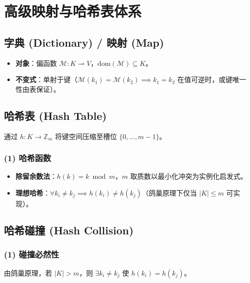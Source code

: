 \section{高级映射与哈希表体系}

\subsection{字典 (Dictionary) / 映射 (Map)}
\begin{itemize}
    \item \textbf{对象}：偏函数 $\mathcal{M}: K \rightharpoonup V$，$\text{dom}(\mathcal{M})\subseteq K$。
    \item \textbf{不变式}：单射于键（$\mathcal{M}(k_1)=\mathcal{M}(k_2)\implies k_1=k_2$ 在值可逆时，或键唯一性由表保证）。
\end{itemize}

\subsection{哈希表 (Hash Table)}
通过 $h: K \to \mathbb{Z}_m$ 将键空间压缩至槽位 $\{0,\dots,m-1\}$。

\subsubsection{(1) 哈希函数}
\begin{itemize}
    \item \textbf{除留余数法}：$h(k)=k\bmod m$，$m$ 取质数以最小化冲突为实例化启发式。
    \item \textbf{理想哈希}：$\forall k_i\neq k_j\implies h(k_i)\neq h(k_j)$（鸽巢原理下仅当 $|K|\le m$ 可实现）。
\end{itemize}

\subsection{哈希碰撞 (Hash Collision)}
\subsubsection{(1) 碰撞必然性}
由鸽巢原理，若 $|K|>m$，则 $\exists k_i\neq k_j$ 使 $h(k_i)=h(k_j)$。

